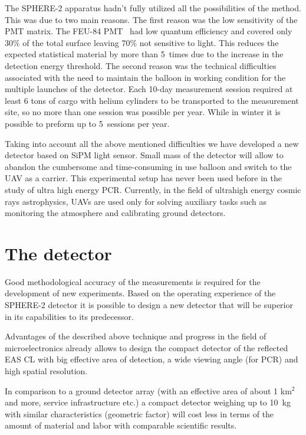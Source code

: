 \documentclass[a4paper,11pt]{article}
\begin{document}
The SPHERE-2 apparatus hadn't fully utilized all the possibilities of the method.
This was due to two main reasons. 
The first reason was the low sensitivity of the PMT matrix. The FEU-84 PMT~\cite{FEU84} had low quantum efficiency and covered only 30\% of the total surface leaving 70\% not sensitive to light. This reduces the expected statistical material by more than 5~times due to the increase in the detection energy threshold. The second reason was the technical difficulties associated with the need to maintain the balloon in working condition for the multiple launches of the detector. Each 10-day measurement session required at least 6 tons of cargo with helium cylinders to be transported to the measurement site, so no more than one session was possible per year. While in winter it is possible to preform up to 5~sessions per year.

Taking into account all the above mentioned difficulties we have developed a new detector based on SiPM light sensor.
Small mass of the detector will allow to abandon the cumbersome and time-consuming in use balloon and switch to the UAV as a carrier.
This experimental setup has never been used before in the study of ultra high energy PCR.
Currently, in the field of ultrahigh energy cosmic rays astrophysics, UAVs are used only for solving auxiliary tasks such as monitoring the atmosphere and calibrating ground detectors.


\section{The detector}

Good methodological accuracy of the measurements is required for the development of new experiments. 
Based on the operating experience of the SPHERE-2 detector it is possible to design a new detector that will be superior in its capabilities to its predecessor.

Advantages of the described above technique and progress in the field of microelectronics already allows to design the compact detector of the reflected EAS CL with big effective area of detection, a wide viewing angle (for PCR) and high spatial resolution. 

In comparison to a ground detector array (with an effective area of about 1 km$^2$ and more, service infrastructure etc.) a compact detector weighing up to 10~kg with similar characteristics (geometric factor) will cost less in terms of the amount of material and labor with comparable scientific results.
\end{document}

